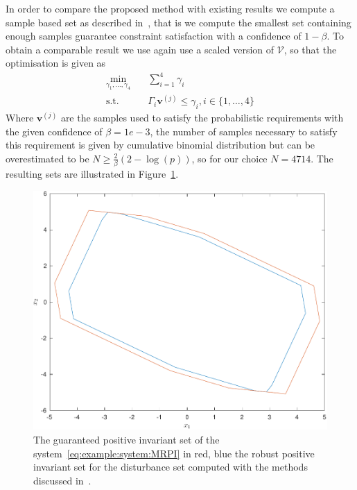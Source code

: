 \documentclass{ifacconf}
\providecommand{\V}{\mathcal V}
\providecommand{\bfa}[1]{\mathbf{#1}}
\begin{document}
In order to compare the proposed method with existing results we compute a sample based set as described in~\cite{Zhang2015}, that is we compute the smallest set containing enough samples guarantee constraint satisfaction with a confidence of $1-\beta$.
%
To obtain a comparable result we use again use a scaled version of $\V$, so that the optimisation is given as
%
\begin{equation}\label{eq:comparison:set}\begin{split}
	\min_{\gamma_1,\dots,\gamma_4}&\quad\sum_{i=1}^4\gamma_i\\
	\text{s.t.}&\quad \Gamma_i \bfa{v}^{(j)}\leq \gamma_i ,i\in\{1,\dots,4\}
\end{split}\end{equation}
%
Where $\bfa{v}^{(j)}$ are the samples used to satisfy the probabilistic requirements with the given confidence of $\beta=1e-3$, the number of samples necessary to satisfy this requirement is given by cumulative binomial distribution but can be overestimated to be $N \geq \frac{2}{\beta}(2-\log(p))$, so for our choice $N = 4714$.
%
The resulting sets are illustrated in Figure~\ref{fig:MRPI:optimised}.
%
\begin{figure}
\includegraphics[width=.95\linewidth]{MRPIsetOptimised.pdf}
\caption{The guaranteed positive invariant set of the system~\eqref{eq:example:system:MRPI} in red, blue the robust positive invariant set for the disturbance set computed with the methods discussed in~\cite{Zhang2015}.}
\label{fig:MRPI:optimised}
\end{figure}
\end{document}
